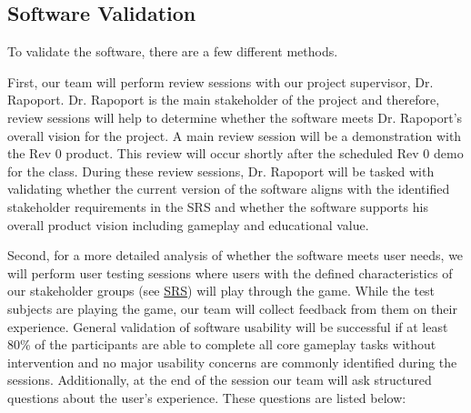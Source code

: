\documentclass[12pt, titlepage]{article}
\renewcommand{\wss}[1]{}
\begin{document}
\subsection{Software Validation}

\wss{If there is any external data that can be used for validation, you should
  point to it here.  If there are no plans for validation, you should state that
  here.}

\wss{You might want to use review sessions with the stakeholder to check that
the requirements document captures the right requirements.  Maybe task based
inspection?}

\wss{For those capstone teams with an external supervisor, the Rev 0 demo should 
be used as an opportunity to validate the requirements.  You should plan on 
demonstrating your project to your supervisor shortly after the scheduled Rev 0 demo.  
The feedback from your supervisor will be very useful for improving your project.}

\wss{For teams without an external supervisor, user testing can serve the same purpose 
as a Rev 0 demo for the supervisor.}

\wss{This section might reference back to the SRS verification section.}

To validate the software, there are a few different methods.

First, our team will perform review sessions with our project supervisor, Dr. Rapoport. Dr. Rapoport is the main stakeholder of the project and therefore, review sessions will help to determine whether the software meets Dr. Rapoport's overall vision for the project. A main review session will be a demonstration with the Rev 0 product. This review will occur shortly after the scheduled Rev 0 demo for the class. During these review sessions, Dr. Rapoport will be tasked with validating whether the current version of the software aligns with the identified stakeholder requirements in the SRS and whether the software supports his overall product vision including gameplay and educational value.

Second, for a more detailed analysis of whether the software meets user needs, we will perform user testing sessions where users with the defined characteristics of our stakeholder groups (see \href{https://github.com/Jacob-MB/magic-8/blob/main/pdfs/SRS-IEEE/SRS.pdf}{SRS}) will play through the game. While the test subjects are playing the game, our team will collect feedback from them on their experience. General validation of software usability will be successful if at least 80\% of the participants are able to complete all core gameplay tasks without intervention and no major usability concerns are commonly identified during the sessions. Additionally, at the end of the session our team will ask structured questions about the user's experience. These questions are listed below:
\end{document}
